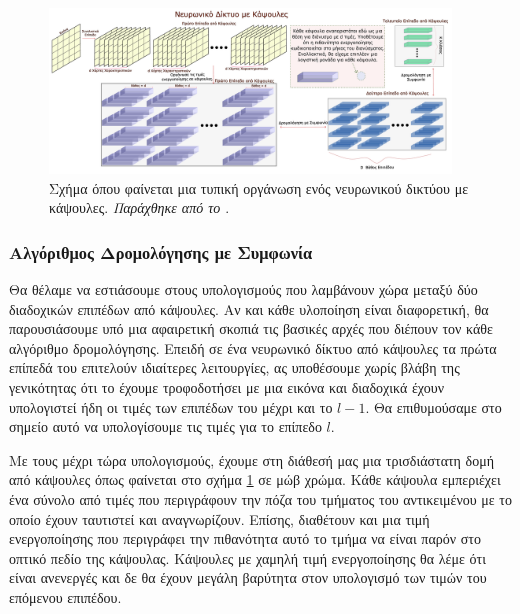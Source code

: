 \begin{figure}[h]
  \centering
  \includegraphics[width=0.95\textwidth]{images/chapter theoritical background/full_convolutional_capsule_layers_gr.pdf}
  \caption{Σχήμα όπου φαίνεται μια τυπική οργάνωση ενός νευρωνικού δικτύου με κάψουλες. \textit{Παράχθηκε από το \href{https://inkscape.org/}{}}.}
  \label{fig:convolutional_caps_superimage}
\end{figure}

\subsubsection{Αλγόριθμος Δρομολόγησης με Συμφωνία}

Θα θέλαμε να εστιάσουμε στους υπολογισμούς που λαμβάνουν χώρα μεταξύ δύο διαδοχικών επιπέδων από κάψουλες. Αν και κάθε υλοποίηση είναι διαφορετική, θα παρουσιάσουμε υπό μια αφαιρετική σκοπιά τις βασικές αρχές που διέπουν τον κάθε αλγόριθμο δρομολόγησης. Επειδή σε ένα νευρωνικό δίκτυο από κάψουλες τα πρώτα επίπεδά του επιτελούν ιδιαίτερες λειτουργίες, ας υποθέσουμε χωρίς βλάβη της γενικότητας ότι το έχουμε τροφοδοτήσει με μια εικόνα και διαδοχικά έχουν υπολογιστεί ήδη οι τιμές των επιπέδων του μέχρι και το $l-1$. Θα επιθυμούσαμε στο σημείο αυτό να υπολογίσουμε τις τιμές για το επίπεδο $l$. \par

Με τους μέχρι τώρα υπολογισμούς, έχουμε στη διάθεσή μας μια τρισδιάστατη δομή από κάψουλες όπως φαίνεται στο σχήμα \ref{fig:convolutional_caps_superimage} σε μώβ χρώμα. Κάθε κάψουλα εμπεριέχει ένα σύνολο από τιμές που περιγράφουν την πόζα του τμήματος του αντικειμένου με το οποίο έχουν ταυτιστεί και αναγνωρίζουν. Επίσης, διαθέτουν και μια τιμή ενεργοποίησης που περιγράφει την πιθανότητα αυτό το τμήμα να είναι παρόν στο οπτικό πεδίο της κάψουλας. Κάψουλες με χαμηλή τιμή ενεργοποίησης θα λέμε ότι είναι ανενεργές και δε θα έχουν μεγάλη βαρύτητα στον υπολογισμό των τιμών του επόμενου επιπέδου. \par

